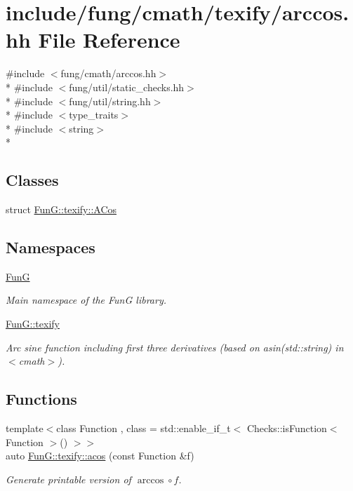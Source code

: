 \hypertarget{texify_2arccos_8hh}{\section{include/fung/cmath/texify/arccos.hh File Reference}
\label{texify_2arccos_8hh}
}
{\ttfamily \#include $<$fung/cmath/arccos.\-hh$>$}\\*
{\ttfamily \#include $<$fung/util/static\-\_\-checks.\-hh$>$}\\*
{\ttfamily \#include $<$fung/util/string.\-hh$>$}\\*
{\ttfamily \#include $<$type\-\_\-traits$>$}\\*
{\ttfamily \#include $<$string$>$}\\*
\subsection*{Classes}
\begin{DoxyCompactItemize}
\item 
struct \hyperlink{structFunG_1_1texify_1_1ACos}{Fun\-G\-::texify\-::\-A\-Cos}
\end{DoxyCompactItemize}
\subsection*{Namespaces}
\begin{DoxyCompactItemize}
\item 
\hyperlink{namespaceFunG}{Fun\-G}
\begin{DoxyCompactList}\small\item\em Main namespace of the Fun\-G library. \end{DoxyCompactList}\item 
\hyperlink{namespaceFunG_1_1texify}{Fun\-G\-::texify}
\begin{DoxyCompactList}\small\item\em Arc sine function including first three derivatives (based on asin(std\-::string) in $<$cmath$>$). \end{DoxyCompactList}\end{DoxyCompactItemize}
\subsection*{Functions}
\begin{DoxyCompactItemize}
\item 
{\footnotesize template$<$class Function , class  = std\-::enable\-\_\-if\-\_\-t$<$ Checks\-::is\-Function$<$ Function $>$() $>$$>$ }\\auto \hyperlink{group__TexifyCMathGroup_ga25006ed8aa960202cb697a70cd177070}{Fun\-G\-::texify\-::acos} (const Function \&f)
\begin{DoxyCompactList}\small\item\em Generate printable version of $ \arccos\circ f $. \end{DoxyCompactList}\end{DoxyCompactItemize}

